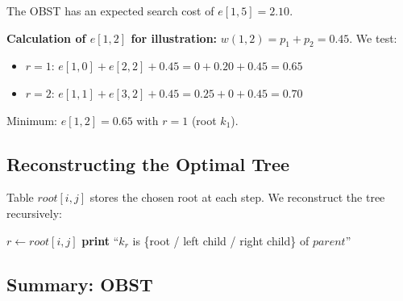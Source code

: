 The OBST has an expected search cost of $e[1,5] = \mathbf{2.10}$.

\textbf{Calculation of $e[1,2]$ for illustration:}
$w(1,2) = p_1 + p_2 = 0.45$. We test:
\begin{itemize}[noitemsep]
  \item $r = 1$: $e[1,0] + e[2,2] + 0.45 = 0 + 0.20 + 0.45 = 0.65$
  \item $r = 2$: $e[1,1] + e[3,2] + 0.45 = 0.25 + 0 + 0.45 = 0.70$
\end{itemize}
Minimum: $e[1,2] = 0.65$ with $r = 1$ (root $k_1$).

\subsection{Reconstructing the Optimal Tree}

Table $\mathit{root}[i,j]$ stores the chosen root at each step. We
reconstruct the tree recursively:

\begin{algorithm}[H]
\caption{Build-Optimal-BST($\mathit{root}$, $i$, $j$, $\mathit{parent}$)}
\begin{algorithmic}[1]
    \State \Return {}
\EndIf
\State $r \leftarrow \mathit{root}[i,j]$
\State \textbf{print} ``$k_r$ is \{root / left child / right child\} of $\mathit{parent}$''
\State {}   
\State {}   
\end{algorithmic}
\end{algorithm}

\subsection{Summary: OBST}

